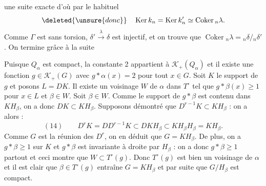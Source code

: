 une suite exacte
d'où par le   habituel
\[
\deleted{\unsure{donc}}\quad \operatorname{Ker}k_n=\operatorname{Ker}k'_n\simeq\operatorname{Coker}{}_n\lambda.
\]
Comme $\Gamma$ est sans torsion,  $\delta'\xrightarrow{\lambda}\delta$ est injectif, et on trouve que $\operatorname{Coker}{}_n\lambda={}_n\delta/{}_n\delta'$. On termine grâce à la suite

Puisque $Q_\alpha$ est compact, la constante 2 appartient à $\mathcal K_+(Q_\alpha)$ et il existe une fonction $g\in\mathcal K_+(G)$ avec $g*\alpha(x)=2$ pour tout $x\in G$. Soit $K$ le support de $g$ et posons $L=DK$. Il existe un voisinage $W$ de $\alpha$ dans $T^\circ$ tel que $g*\beta(x)\geq 1$ pour $x\in L$ et $\beta\in W$. Soit $\beta\in W$. Comme le support de $g*\beta$ est contenu dans $KH_\beta$, on a donc $DK\subset KH_\beta$. Supposons démontré que $D^{r-1}K\subset KH_\beta$ : on a alors :
\[
(14)\qquad D^rK=DD^{r-1}K\subset DKH_\beta\subset KH_\beta H_\beta=KH_\beta.
\]
Comme $G$ est la réunion des $D^r$, on en déduit que $G=KH_\beta$. De plus, on a $g*\beta\geq 1$ sur $K$ et $g*\beta$ est invariante à droite par $H_\beta$ : on a donc $g*\beta\geq 1$ partout et ceci montre que $W\subset T^\circ(g)$. Donc $T^\circ(g)$ est bien un voisinage de $\alpha$ et il est clair que $\beta\in T^\circ(g)$ entraîne $G=KH_\beta$ et par suite que $G/H_\beta$ est compact.

